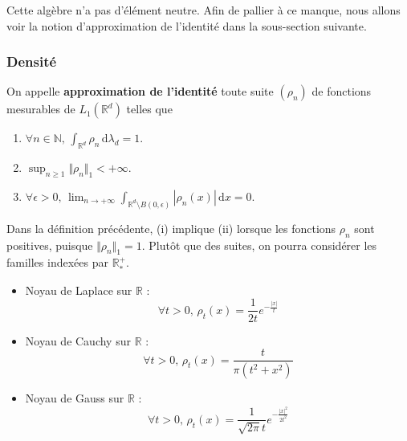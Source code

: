   \begin{remark}
    Cette algèbre n'a pas d'élément neutre. Afin de pallier à ce manque, nous allons voir la notion d'approximation de l'identité dans la sous-section suivante.
  \end{remark}

  \subsubsection{Densité}


  \begin{definition}
    On appelle \textbf{approximation de l'identité} toute suite $(\rho_n)$ de fonctions mesurables de $L_1(\mathbb{R}^d)$ telles que
    \begin{enumerate}[label={\bfseries(\roman*)}]
      \item $\forall n \in \mathbb{N}, \, \int_{\mathbb{R}^d} \rho_n \, \mathrm{d}\lambda_d = 1$.
      \item $\sup_{n \geq 1} \Vert \rho_n \Vert_1 < +\infty$.
      \item $\forall \epsilon > 0, \, \lim_{n \rightarrow +\infty} \int_{\mathbb{R}^d \setminus B(0, \epsilon)} |\rho_n(x)| \, \mathrm{d}x = 0$.
    \end{enumerate}
  \end{definition}

  \begin{remark}
    Dans la définition précédente, (i) implique (ii) lorsque les fonctions $\rho_n$ sont positives, puisque $\Vert\rho_n\Vert_1=1$. Plutôt que des suites, on pourra considérer les familles indexées par $\mathbb{R}_*^+$.
  \end{remark}

  \begin{example}
    \begin{itemize}
      \item Noyau de Laplace sur $\mathbb{R}$ :
      \[ \forall t > 0, \, \rho_t(x) = \frac{1}{2t}e^{-\frac{|x|}{t}} \]
      \item Noyau de Cauchy sur $\mathbb{R}$ :
      \[ \forall t > 0, \, \rho_t(x) = \frac{t}{\pi (t^2 + x^2)} \]
      \item Noyau de Gauss sur $\mathbb{R}$ :
      \[ \forall t > 0, \, \rho_t(x) = \frac{1}{\sqrt{2\pi} t}e^{-\frac{|x|^2}{2t^2}} \]
    \end{itemize}
  \end{example}

